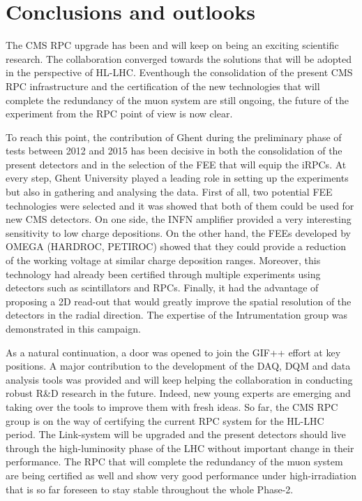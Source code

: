 \renewcommand\evenpagerightmark{{\scshape\small Chapter 7}}
\renewcommand\oddpageleftmark{{\scshape\small Conclusions and outlooks}}

\hyphenation{}

\chapter[Conclusions and outlooks]{Conclusions and outlooks}
\label{chapt7}
	
	The CMS RPC upgrade has been and will keep on being an exciting scientific research. The collaboration converged towards the solutions that will be adopted in the perspective of HL-LHC. Eventhough the consolidation of the present CMS RPC infrastructure and the certification of the new technologies that will complete the redundancy of the muon system are still ongoing, the future of the experiment from the RPC point of view is now clear.
	
	To reach this point, the contribution of Ghent during the preliminary phase of tests between 2012 and 2015 has been decisive in both the consolidation of the present detectors and in the selection of the \acl{FEE} that will equip the iRPCs. At every step, Ghent University played a leading role in setting up the experiments but also in gathering and analysing the data. First of all, two potential FEE technologies were selected and it was showed that both of them could be used for new CMS detectors. On one side, the INFN amplifier provided a very interesting sensitivity to low charge depositions. On the other hand, the FEEs developed by OMEGA (HARDROC, PETIROC) showed that they could provide a reduction of the working voltage at similar charge deposition ranges. Moreover, this technology had already been certified through multiple experiments using detectors such as scintillators and RPCs. Finally, it had the advantage of proposing a 2D read-out that would greatly improve the spatial resolution of the detectors in the radial direction. The expertise of the Intrumentation group was demonstrated in this campaign.
	
	As a natural continuation, a door was opened to join the GIF++ effort at key positions. A major contribution to the development of the \acl{DAQ}, \acl{DQM} and data analysis tools was provided and will keep helping the collaboration in conducting robust R\&D research in the future. Indeed, new young experts are emerging and taking over the tools to improve them with fresh ideas. So far, the CMS RPC group is on the way of certifying the current RPC system for the HL-LHC period. The Link-system will be upgraded and the present detectors should live through the high-luminosity phase of the LHC without important change in their performance. The RPC that will complete the redundancy of the muon system are being certified as well and show very good performance under high-irradiation that is so far foreseen to stay stable throughout the whole Phase-2.
	
